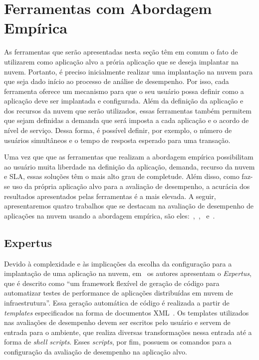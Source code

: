 \section{Ferramentas com Abordagem Empírica}
As ferramentas que serão apresentadas nesta seção têm em comum o fato de utilizarem como aplicação alvo a prória aplicação que se deseja implantar na nuvem. Portanto, é preciso inicialmente realizar uma implantação na nuvem para que seja dado início ao processo de análise de desempenho. Por isso, cada ferramenta oferece um mecanismo para que o seu usuário possa definir como a aplicação deve ser implantada e configurada. Além da definição da aplicação e dos recursos da nuvem que serão utilizados, essas ferramentas também permitem que sejam definidas a demanda que será imposta a cada aplicação e o acordo de nível de serviço. Dessa forma, é possível definir, por exemplo, o número de usuários simultâneos e o tempo de resposta esperado para uma transação.

Uma vez que que as ferramentas que realizam a abordagem empírica possibilitam ao usuário muita liberdade na definição da aplicação, demanda, recurso da nuvem e SLA, essas soluções têm o mais alto grau de completude. Além disso, como faz-se uso da própria aplicação alvo para a avaliação de desempenho, a acurácia dos resultados apresentados pelas ferramentas é a mais elevada. A seguir, apresentaremos quatro trabalhos que se destacam na avaliação de desempenho de aplicações na nuvem usando a abordagem empírica, são eles:~\cite{jayasinghe2012},~\cite{silva2013cloudbench},~\cite{cunhacloud} e~\cite{scheuner2014cloud}.

\subsection{Expertus}
Devido à complexidade e às implicações da escolha da configuração para a implantação de uma aplicação na nuvem, em~\cite{jayasinghe2012} os autores apresentam o \textit{Expertus}, que é descrito como ``um framework flexível de geração de código para automatizar testes de performance de aplicações distribuídas em nuvem de infraestrutura''. Essa geração automática de código é realizada a partir de {\em templates} especificados na forma de documentos XML~\cite{jayasinghe2012}. Os templates utilizados nas avaliações de desempenho devem ser escritos pelo usuário e servem de entrada para o ambiente, que realiza diversas transformações nessa entrada até a forma de \textit{shell scripts}. Esses \textit{scripts}, por fim, possuem os comandos para a configuração da avaliação de desempenho na aplicação alvo.

